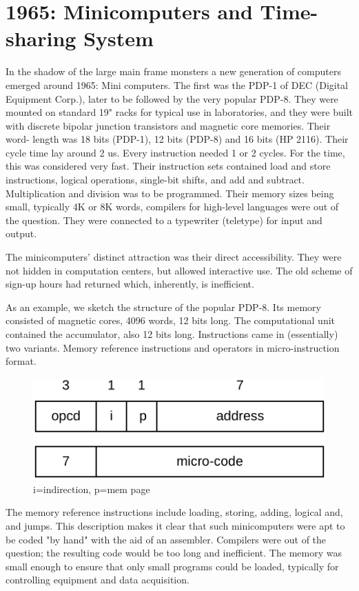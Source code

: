 \section{1965: Minicomputers and Time-sharing System}
In the shadow of the large main frame monsters a new generation of computers
emerged around 1965: Mini computers. The first was the PDP-1 of DEC (Digital
Equipment Corp.), later to be followed by the very popular PDP-8. They were
mounted on standard 19" racks for typical use in laboratories, and they were built
with discrete bipolar junction transistors and magnetic core memories. Their word-
length was 18 bits (PDP-1), 12 bits (PDP-8) and 16 bits (HP 2116). Their cycle
time lay around 2 us. Every instruction needed 1 or 2 cycles. For the time, this was
considered very fast. Their instruction sets contained load and store instructions,
logical operations, single-bit shifts, and add and subtract. Multiplication and
division was to be programmed. Their memory sizes being small, typically 4K or 8K
words, compilers for high-level languages were out of the question. They were
connected to a typewriter (teletype) for input and output.

The minicomputers' distinct attraction was their direct accessibility. They were not
hidden in computation centers, but allowed interactive use. The old scheme of
sign-up hours had returned which, inherently, is inefficient.

As an example, we sketch the structure of the popular PDP-8. Its memory
consisted of magnetic cores, 4096 words, 12 bits long. The computational unit
contained the accumulator, also 12 bits long. Instructions came in (essentially) two
variants. Memory reference instructions and operators in micro-instruction format.
\begin{figure}[h!]
  \centering
  \includegraphics[width=.75\textwidth]{i/3}
  \caption{i=indirection, p=mem page}
\end{figure}

The memory reference instructions include loading, storing, adding, logical and,
and jumps. This description makes it clear that such minicomputers were apt to be
coded "by hand" with the aid of an assembler. Compilers were out of the question;
the resulting code would be too long and inefficient. The memory was small
enough to ensure that only small programs could be loaded, typically for controlling
equipment and data acquisition.

